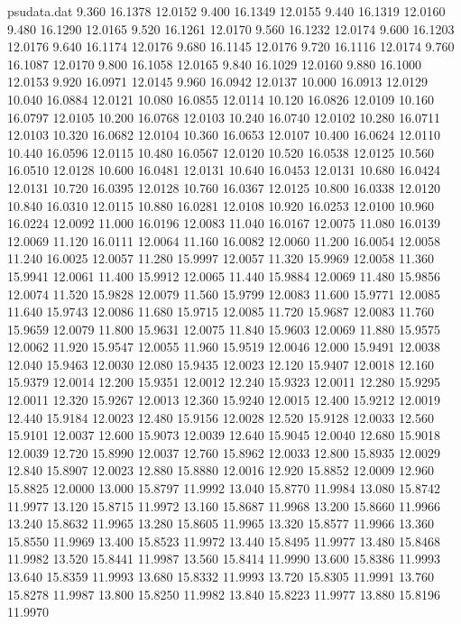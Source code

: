 \begin{filecontents*}{psudata.dat}
9.360 16.1378 12.0152
9.400 16.1349 12.0155
9.440 16.1319 12.0160
9.480 16.1290 12.0165
9.520 16.1261 12.0170
9.560 16.1232 12.0174
9.600 16.1203 12.0176
9.640 16.1174 12.0176
9.680 16.1145 12.0176
9.720 16.1116 12.0174
9.760 16.1087 12.0170
9.800 16.1058 12.0165
9.840 16.1029 12.0160
9.880 16.1000 12.0153
9.920 16.0971 12.0145
9.960 16.0942 12.0137
10.000 16.0913 12.0129
10.040 16.0884 12.0121
10.080 16.0855 12.0114
10.120 16.0826 12.0109
10.160 16.0797 12.0105
10.200 16.0768 12.0103
10.240 16.0740 12.0102
10.280 16.0711 12.0103
10.320 16.0682 12.0104
10.360 16.0653 12.0107
10.400 16.0624 12.0110
10.440 16.0596 12.0115
10.480 16.0567 12.0120
10.520 16.0538 12.0125
10.560 16.0510 12.0128
10.600 16.0481 12.0131
10.640 16.0453 12.0131
10.680 16.0424 12.0131
10.720 16.0395 12.0128
10.760 16.0367 12.0125
10.800 16.0338 12.0120
10.840 16.0310 12.0115
10.880 16.0281 12.0108
10.920 16.0253 12.0100
10.960 16.0224 12.0092
11.000 16.0196 12.0083
11.040 16.0167 12.0075
11.080 16.0139 12.0069
11.120 16.0111 12.0064
11.160 16.0082 12.0060
11.200 16.0054 12.0058
11.240 16.0025 12.0057
11.280 15.9997 12.0057
11.320 15.9969 12.0058
11.360 15.9941 12.0061
11.400 15.9912 12.0065
11.440 15.9884 12.0069
11.480 15.9856 12.0074
11.520 15.9828 12.0079
11.560 15.9799 12.0083
11.600 15.9771 12.0085
11.640 15.9743 12.0086
11.680 15.9715 12.0085
11.720 15.9687 12.0083
11.760 15.9659 12.0079
11.800 15.9631 12.0075
11.840 15.9603 12.0069
11.880 15.9575 12.0062
11.920 15.9547 12.0055
11.960 15.9519 12.0046
12.000 15.9491 12.0038
12.040 15.9463 12.0030
12.080 15.9435 12.0023
12.120 15.9407 12.0018
12.160 15.9379 12.0014
12.200 15.9351 12.0012
12.240 15.9323 12.0011
12.280 15.9295 12.0011
12.320 15.9267 12.0013
12.360 15.9240 12.0015
12.400 15.9212 12.0019
12.440 15.9184 12.0023
12.480 15.9156 12.0028
12.520 15.9128 12.0033
12.560 15.9101 12.0037
12.600 15.9073 12.0039
12.640 15.9045 12.0040
12.680 15.9018 12.0039
12.720 15.8990 12.0037
12.760 15.8962 12.0033
12.800 15.8935 12.0029
12.840 15.8907 12.0023
12.880 15.8880 12.0016
12.920 15.8852 12.0009
12.960 15.8825 12.0000
13.000 15.8797 11.9992
13.040 15.8770 11.9984
13.080 15.8742 11.9977
13.120 15.8715 11.9972
13.160 15.8687 11.9968
13.200 15.8660 11.9966
13.240 15.8632 11.9965
13.280 15.8605 11.9965
13.320 15.8577 11.9966
13.360 15.8550 11.9969
13.400 15.8523 11.9972
13.440 15.8495 11.9977
13.480 15.8468 11.9982
13.520 15.8441 11.9987
13.560 15.8414 11.9990
13.600 15.8386 11.9993
13.640 15.8359 11.9993
13.680 15.8332 11.9993
13.720 15.8305 11.9991
13.760 15.8278 11.9987
13.800 15.8250 11.9982
13.840 15.8223 11.9977
13.880 15.8196 11.9970

\end{filecontents*}

